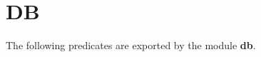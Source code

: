 %
% 
% 
% 
% 


\section{\eclipse DB}

The following predicates are exported by the module {\bf db}.


